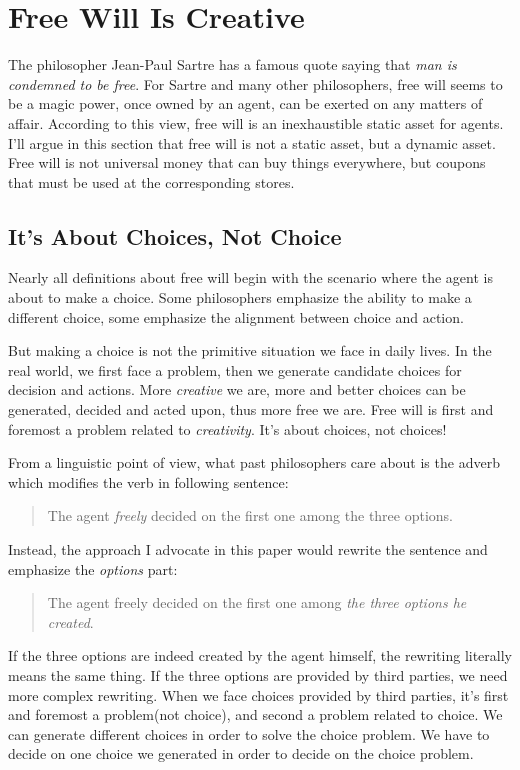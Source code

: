 \section{Free Will Is Creative}

The philosopher Jean-Paul Sartre has a famous quote saying that \emph{man is condemned to be free}. For Sartre and many other philosophers, free will seems to be a magic power, once owned by an agent, can be exerted on any matters of affair. According to this view, free will is an inexhaustible static asset for agents. I'll argue in this section that free will is not a static asset, but a dynamic asset. Free will is not universal money that can buy things everywhere, but coupons that must be used at the corresponding stores.

\subsection{It's About Choices, Not Choice}

Nearly all definitions about free will begin with the scenario where the agent is about to make a choice. Some philosophers emphasize the ability to make a different choice, some emphasize the alignment between choice and action.

But making a choice is not the primitive situation we face in daily lives. In the real world, we first face a problem, then we generate candidate choices for decision and actions. More \emph{creative} we are, more and better choices can be generated, decided and acted upon, thus more free we are. Free will is first and foremost a problem related to \emph{creativity}. It's about choices, not choices!

From a linguistic point of view, what past philosophers care about is the adverb which modifies the verb in following sentence:

\begin{quote}
  The agent \emph{freely} decided on the first one among the three options.
\end{quote}

Instead, the approach I advocate in this paper would rewrite the sentence and emphasize the \emph{options} part:

\begin{quote}
  The agent freely decided on the first one among \emph{the three options he created}.
\end{quote}

If the three options are indeed created by the agent himself, the rewriting literally means the same thing. If the three options are provided by third parties, we need more complex rewriting. When we face choices provided by third parties, it's first and foremost a problem(not choice), and second a problem related to choice. We can generate different choices in order to solve the choice problem. We have to decide on one choice we generated in order to decide on the choice problem.

